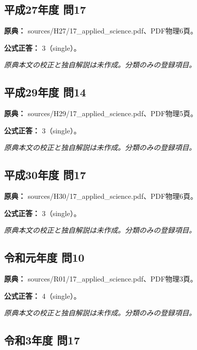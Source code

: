 \subsection{平成27年度 問17}
\label{q:h27-reg-applied-17}

\noindent\textbf{原典：} sources/H27/17\_applied\_science.pdf、PDF物理6頁。

\textbf{公式正答：} 3（single）。

\par\textit{原典本文の校正と独自解説は未作成。分類のみの登録項目。}

\subsection{平成29年度 問14}
\label{q:h29-reg-applied-14}

\noindent\textbf{原典：} sources/H29/17\_applied\_science.pdf、PDF物理5頁。

\textbf{公式正答：} 3（single）。

\par\textit{原典本文の校正と独自解説は未作成。分類のみの登録項目。}

\subsection{平成30年度 問17}
\label{q:h30-reg-applied-17}

\noindent\textbf{原典：} sources/H30/17\_applied\_science.pdf、PDF物理6頁。

\textbf{公式正答：} 3（single）。

\par\textit{原典本文の校正と独自解説は未作成。分類のみの登録項目。}

\subsection{令和元年度 問10}
\label{q:r01-reg-applied-10}

\noindent\textbf{原典：} sources/R01/17\_applied\_science.pdf、PDF物理3頁。

\textbf{公式正答：} 4（single）。

\par\textit{原典本文の校正と独自解説は未作成。分類のみの登録項目。}

\subsection{令和3年度 問17}
\label{q:r03-reg-applied-17}

